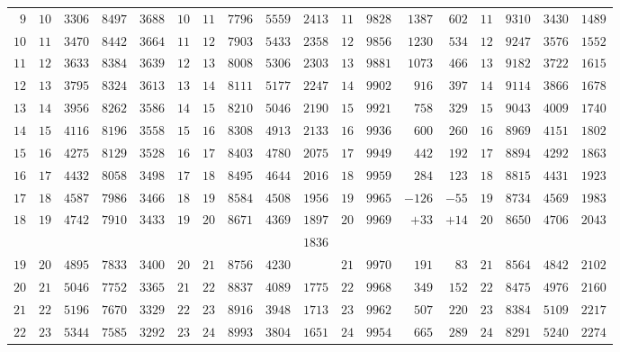 \begin{center}
{{\begin{minipage}{.96\linewidth}
\begin{tabular}{r|r|r|r|r||r|r|r|r|r||r|r|r|r||r|r|r|r}
$9$ & $10$ & $3306$ & $8497$ & $3688$ & $10$ & $11$ & $7796$ & $5559$ & $2413$ & $11$ & $9828$ & $1387$ & $602$ & $11$ & $9310$ & $3430$ & $1489$\\
$10$ & $11$ & $3470$ & $8442$ & $3664$ & $11$ & $12$ & $7903$ & $5433$ & $2358$ & $12$ & $9856$ & $1230$ & $534$ & $12$ & $9247$ & $3576$ & $1552$\\
$11$ & $12$ & $3633$ & $8384$ & $3639$ & $12$ & $13$ & $8008$ & $5306$ & $2303$ & $13$ & $9881$ & $1073$ & $466$ & $13$ & $9182$ & $3722$ & $1615$\\
$12$ & $13$ & $3795$ & $8324$ & $3613$ & $13$ & $14$ & $8111$ & $5177$ & $2247$ & $14$ & $9902$ & $916$ & $397$ & $14$ & $9114$ & $3866$ & $1678$\\
$13$ & $14$ & $3956$ & $8262$ & $3586$ & $14$ & $15$ & $8210$ & $5046$ & $2190$ & $15$ & $9921$ & $758$ & $329$ & $15$ & $9043$ & $4009$ & $1740$\\[3pt]
$14$ & $15$ & $4116$ & $8196$ & $3558$ & $15$ & $16$ & $8308$ & $4913$ & $2133$ & $16$ & $9936$ & $600$ & $260$ & $16$ & $8969$ & $4151$ & $1802$\\
$15$ & $16$ & $4275$ & $8129$ & $3528$ & $16$ & $17$ & $8403$ & $4780$ & $2075$ & $17$ & $9949$ & $442$ & $192$ & $17$ & $8894$ & $4292$ & $1863$\\
$16$ & $17$ & $4432$ & $8058$ & $3498$ & $17$ & $18$ & $8495$ & $4644$ & $2016$ & $18$ & $9959$ & $284$ & $123$ & $18$ & $8815$ & $4431$ & $1923$\\
$17$ & $18$ & $4587$ & $7986$ & $3466$ & $18$ & $19$ & $8584$ & $4508$ & $1956$ & $19$ & $9965$ & $-126$ & $-55$ & $19$ & $8734$ & $4569$ & $1983$\\
$18$ & $19$ & $4742$ & $7910$ & $3433$ & $19$ & $20$ & $8671$ & $4369$ & $1897$ & $20$ & $9969$ & $+33$ & $+14$ & $20$ & $8650$ & $4706$ & $2043$\\
 &  &  &  &  &  &  &  &  & $1836$ &  &  &  &  &  &  &  & \\
$19$ & $20$ & $4895$ & $7833$ & $3400$ & $20$ & $21$ & $8756$ & $4230$ &  & $21$ & $9970$ & $191$ & $83$ & $21$ & $8564$ & $4842$ & $2102$\\
$20$ & $21$ & $5046$ & $7752$ & $3365$ & $21$ & $22$ & $8837$ & $4089$ & $1775$ & $22$ & $9968$ & $349$ & $152$ & $22$ & $8475$ & $4976$ & $2160$\\
$21$ & $22$ & $5196$ & $7670$ & $3329$ & $22$ & $23$ & $8916$ & $3948$ & $1713$ & $23$ & $9962$ & $507$ & $220$ & $23$ & $8384$ & $5109$ & $2217$\\
$22$ & $23$ & $5344$ & $7585$ & $3292$ & $23$ & $24$ & $8993$ & $3804$ & $1651$ & $24$ & $9954$ & $665$ & $289$ & $24$ & $8291$ & $5240$ & $2274$\\

\end{tabular}
\end{minipage}}}
\end{center}
